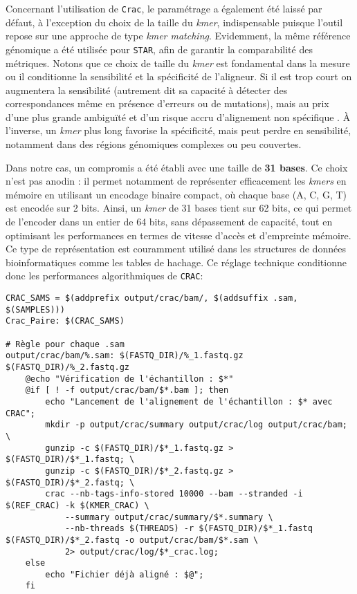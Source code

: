 Concernant l'utilisation de \texttt{Crac}, le paramétrage a également été laissé par défaut, à l'exception du choix de la taille du \textit{kmer}, indispensable puisque l’outil repose sur une approche de type \textit{kmer matching}. Evidemment, la même référence génomique a été utilisée pour \texttt{STAR}, afin de garantir la comparabilité des métriques. Notons que ce choix de taille du \textit{kmer} est fondamental dans la mesure ou il conditionne la sensibilité et la spécificité de l’aligneur. Si il est trop court on augmentera la sensibilité (autrement dit sa capacité à détecter des correspondances même en présence d’erreurs ou de mutations), mais au prix d’une plus grande ambiguïté et d’un risque accru d'alignement non spécifique \textsuperscript{\cite{mancheron_motifs_2006}} . À l’inverse, un \textit{kmer} plus long favorise la spécificité, mais peut perdre en sensibilité, notamment dans des régions génomiques complexes ou peu couvertes.

Dans notre cas, un compromis a été établi avec une taille de \textbf{31 bases}. Ce choix n’est pas anodin : il permet notamment de représenter efficacement les \textit{kmers} en mémoire en utilisant un encodage binaire compact, où chaque base (A, C, G, T) est encodée sur 2 bits. Ainsi, un \textit{kmer} de 31 bases tient sur 62 bits, ce qui permet de l’encoder dans un entier de 64 bits, sans dépassement de capacité, tout en optimisant les performances en termes de vitesse d’accès et d’empreinte mémoire. Ce type de représentation est couramment utilisé dans les structures de données bioinformatiques comme les tables de hachage. Ce réglage technique conditionne donc les performances algorithmiques de \texttt{CRAC}:

\begin{lstlisting}[style=makefileStyle, label={lst:CRACAlign}, caption={\underline{Cible \texttt{Crac\_Paire} pour générer les \texttt{BAM} avec CRAC}}]
CRAC_SAMS = $(addprefix output/crac/bam/, $(addsuffix .sam, $(SAMPLES)))
Crac_Paire: $(CRAC_SAMS)

# Règle pour chaque .sam
output/crac/bam/%.sam: $(FASTQ_DIR)/%_1.fastq.gz $(FASTQ_DIR)/%_2.fastq.gz
	@echo "Vérification de l'échantillon : $*"
	@if [ ! -f output/crac/bam/$*.bam ]; then 
	    echo "Lancement de l'alignement de l'échantillon : $* avec CRAC"; 
	    mkdir -p output/crac/summary output/crac/log output/crac/bam; \
	    gunzip -c $(FASTQ_DIR)/$*_1.fastq.gz > $(FASTQ_DIR)/$*_1.fastq; \
	    gunzip -c $(FASTQ_DIR)/$*_2.fastq.gz > $(FASTQ_DIR)/$*_2.fastq; \
	    crac --nb-tags-info-stored 10000 --bam --stranded -i $(REF_CRAC) -k $(KMER_CRAC) \
	        --summary output/crac/summary/$*.summary \
	        --nb-threads $(THREADS) -r $(FASTQ_DIR)/$*_1.fastq $(FASTQ_DIR)/$*_2.fastq -o output/crac/bam/$*.sam \
	        2> output/crac/log/$*_crac.log;
	else 
	    echo "Fichier déjà aligné : $@"; 
	fi
\end{lstlisting}

